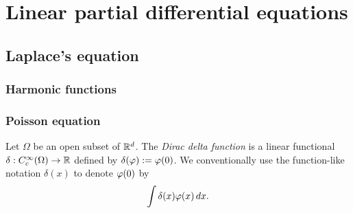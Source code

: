 \documentclass{../note}
\begin{document}
\part{Linear partial differential equations}


\chapter{Laplace's equation}
\section{Harmonic functions}
\begin{prb}
\end{prb}
\begin{prb}
\end{prb}


\begin{prb}
\end{prb}
\begin{prb}
\end{prb}
\begin{prb}
\end{prb}

\section{Poisson equation}
\begin{prb}

\end{prb}
\begin{prb}
Let $\Omega$ be an open subset of $\mathbb{R}^d$.
The \emph{Dirac delta function} is a linear functional $\delta:C_c^\infty(\Omega)\to\mathbb{R}$ defined by $\delta(\varphi):=\varphi(0)$.
We conventionally use the function-like notation $\delta(x)$ to denote $\varphi(0)$ by
\[\int\delta(x)\varphi(x)\,dx.\]


\end{prb}
\end{document}
